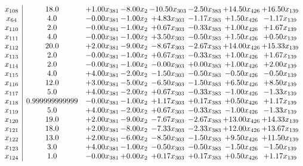 \documentclass[8pt]{article}
\begin{document}
\[\begin{array}{c| c c@{\hskip 2pt} c@{\hskip 2pt} c@{\hskip 2pt} c@{\hskip 2pt} c@{\hskip 2pt} c@{\hskip 2pt} }
 x_{108}   &  18.0 & +  1.00 x_{381} & -8.00 x_{2} & -10.50 x_{303} & -2.50 x_{383} & + 14.50 x_{426} & + 16.50 x_{139}\\
 x_{64}   &  4.0 & -0.00 x_{381} & -1.00 x_{2} & +  4.83 x_{303} & -1.17 x_{383} & +  1.50 x_{426} & -1.17 x_{139}\\
 x_{110}   &  2.0 & -0.00 x_{381} & -1.00 x_{2} & +  0.67 x_{303} & -0.33 x_{383} & +  1.00 x_{426} & +  1.67 x_{139}\\
 x_{111}   &  4.0 & -0.00 x_{381} & -1.00 x_{2} & +  3.50 x_{303} & -0.50 x_{383} & +  1.50 x_{426} & +  0.50 x_{139}\\
 x_{112}   &  20.0 & +  2.00 x_{381} & -9.00 x_{2} & -8.67 x_{303} & -2.67 x_{383} & + 14.00 x_{426} & + 15.33 x_{139}\\
 x_{113}   &  2.0 & -0.00 x_{381} & -1.00 x_{2} & +  0.67 x_{303} & -0.33 x_{383} & +  1.00 x_{426} & +  1.67 x_{139}\\
 x_{114}   &  2.0 & -0.00 x_{381} & -1.00 x_{2} & -0.00 x_{303} & +  0.00 x_{383} & +  1.00 x_{426} & +  2.00 x_{139}\\
 x_{115}   &  4.0 & +  4.00 x_{381} & -2.00 x_{2} & -1.50 x_{303} & -0.50 x_{383} & -0.50 x_{426} & -0.50 x_{139}\\
 x_{116}   &  12.0 & +  3.00 x_{381} & -5.00 x_{2} & -6.50 x_{303} & -1.50 x_{383} & +  6.50 x_{426} & +  8.50 x_{139}\\
 x_{117}   &  5.0 & +  4.00 x_{381} & -2.00 x_{2} & +  0.67 x_{303} & -0.33 x_{383} & -1.00 x_{426} & -1.33 x_{139}\\
 x_{118}   &  0.999999999999 & -0.00 x_{381} & -1.00 x_{2} & +  1.17 x_{303} & +  0.17 x_{383} & +  0.50 x_{426} & +  1.17 x_{139}\\
 x_{119}   &  5.0 & +  4.00 x_{381} & -2.00 x_{2} & +  0.67 x_{303} & -0.33 x_{383} & -1.00 x_{426} & -1.33 x_{139}\\
 x_{120}   &  19.0 & +  2.00 x_{381} & -9.00 x_{2} & -7.67 x_{303} & -2.67 x_{383} & + 13.00 x_{426} & + 14.33 x_{139}\\
 x_{121}   &  18.0 & +  2.00 x_{381} & -8.00 x_{2} & -7.33 x_{303} & -2.33 x_{383} & + 12.00 x_{426} & + 13.67 x_{139}\\
 x_{122}   &  13.0 & +  2.00 x_{381} & -6.00 x_{2} & -8.50 x_{303} & -1.50 x_{383} & +  9.50 x_{426} & + 11.50 x_{139}\\
 x_{123}   &  3.0 & +  4.00 x_{381} & -1.00 x_{2} & -0.50 x_{303} & -0.50 x_{383} & -1.50 x_{426} & -1.50 x_{139}\\
 x_{124}   &  1.0 & -0.00 x_{381} & +  0.00 x_{2} & +  0.17 x_{303} & +  0.17 x_{383} & +  0.50 x_{426} & +  1.17 x_{139}\\

\end{array}\]
\end{document}

